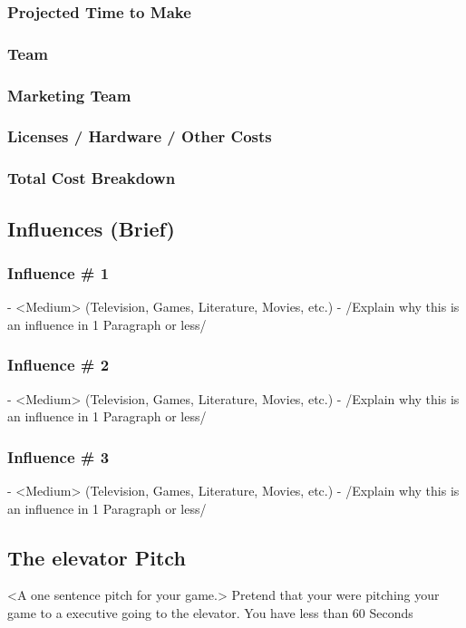 \documentclass[14pt]{article}
\begin{document}
\subsubsection{Projected Time to Make}
\subsubsection{Team}
\subsubsection{Marketing Team}
\subsubsection{Licenses / Hardware / Other Costs}
\subsubsection{Total Cost Breakdown}

\subsection{Influences (Brief)}
\subsubsection{Influence \# 1}
- <Medium> (Television, Games, Literature, Movies, etc.)
- /Explain why this is an influence in 1 Paragraph or less/

\subsubsection{Influence \# 2}
- <Medium> (Television, Games, Literature, Movies, etc.)
- /Explain why this is an influence in 1 Paragraph or less/

\subsubsection{Influence \# 3}
- <Medium> (Television, Games, Literature, Movies, etc.)
- /Explain why this is an influence in 1 Paragraph or less/


\subsection{The elevator Pitch}
<A one sentence pitch for your game.> 
Pretend that your were pitching your game to a executive going to the elevator. You have less than 60 Seconds
\end{document}
